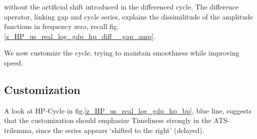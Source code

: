 \documentclass[a4paper]{book}
\begin{document}
\begin{enumerate}
without the artificial shift introduced in the differenced cycle. The difference operator, linking gap and cycle series, explains the dissimilitude of the amplitude functions in frequency zero, recall fig.\ref{z_HP_us_real_log_gdp_hp_diff__gap_amp}.  
\end{enumerate}
We now customize the cycle, trying to maintain smoothness while improving speed.



\subsection{Customization}


A look at HP-Cycle in fig.\ref{z_HP_us_real_log_gdp_hp_bp}, blue line, suggests that the customization should emphasize Timeliness strongly in the ATS-trilemma, since the series appears `shifted to the right' (delayed).
\end{document}
